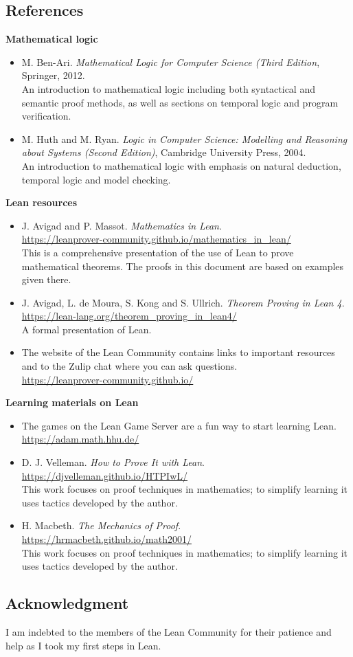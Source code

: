 \subsection*{References}
\textbf{Mathematical logic}
\begin{itemize}
\item M. Ben-Ari. \textit{Mathematical Logic for Computer Science (Third Edition}, Springer, 2012.\\
An introduction to mathematical logic including both syntactical and semantic proof methods, as well as sections on temporal logic and program verification.
\item M. Huth and M. Ryan. \textit{Logic in Computer Science: Modelling and Reasoning about Systems (Second Edition)}, Cambridge University Press, 2004.\\
An introduction to mathematical logic with emphasis on natural deduction, temporal logic and model checking.
\end{itemize}
\textbf{Lean resources}
\begin{itemize}
\item J. Avigad and P. Massot. \textit{Mathematics in Lean}.\\
\indnt\url{https://leanprover-community.github.io/mathematics_in_lean/}\\
This is a comprehensive presentation of the use of Lean to prove mathematical theorems. The proofs in this document are based on examples given there.
\item J. Avigad, L. de Moura, S. Kong and S. Ullrich. 
\textit{Theorem Proving in Lean 4}. \\
\indnt{}\url{https://lean-lang.org/theorem_proving_in_lean4/}\\
A formal presentation of Lean.
\item The website of the Lean Community contains links to important resources and to the Zulip chat where you can ask questions.\\
\indnt{}\url{https://leanprover-community.github.io/}
\end{itemize}
\textbf{Learning materials on Lean}
\begin{itemize}
\item The games on the Lean Game Server are a fun way to start learning Lean.\\
\indnt{}\url{https://adam.math.hhu.de/}
\item D. J. Velleman. \textit{How to Prove It with Lean}.\\
\indnt{}\url{https://djvelleman.github.io/HTPIwL/}\\
This work focuses on proof techniques in mathematics; to simplify learning it uses tactics developed by the author.
\item H. Macbeth. \textit{The Mechanics of Proof}.\\
\indnt{}\url{https://hrmacbeth.github.io/math2001/}\\
This work focuses on proof techniques in mathematics; to simplify learning it uses tactics developed by the author.
\end{itemize}

\subsection*{Acknowledgment}

I am indebted to the members of the Lean Community for their patience and help as I took my first steps in Lean.
